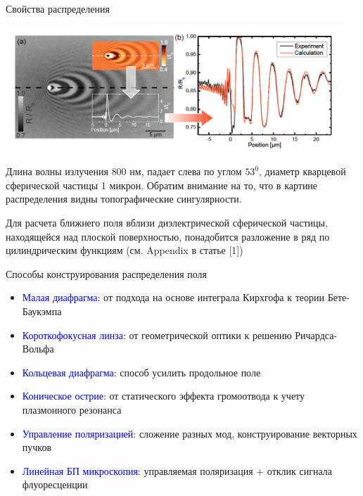 \documentclass[9pt, compress, xcolor=table]{beamer}
\begin{document}
\begin{frame}{Свойства распределения}

\begin{center}
\includegraphics[width=0.95\textwidth]{near-field1}
\end{center}

Длина волны излучения $800$ нм, падает слева по углом $53^{0}$, диаметр кварцевой сферической частицы 1 микрон. Обратим внимание на то, что в картине распределения видны топографические сингулярности.

Для расчета ближнего поля вблизи диэлектрической сферической частицы, находящейся над плоской поверхностью, понадобится разложение в ряд по цилиндрическим функциям (см. Appendix в статье [1])
\end{frame}

\begin{frame}{Способы конструирования распределения поля}

\begin{itemize}
\item \textcolor{blue}{Малая диафрагма}: от подхода на основе интеграла Кирхгофа к теории Бете-Баукэмпа

\item \textcolor{blue}{Короткофокусная линза}: от геометрической оптики к решению Ричардса-Вольфа

\item \textcolor{blue}{Кольцевая диафрагма}: способ усилить продольное поле

\item \textcolor{blue}{Коническое острие}: от статического эффекта громоотвода к учету плазмонного резонанса

\item \textcolor{blue}{Управление поляризацией}: сложение разных мод, конструирование векторных пучков

\item \textcolor{blue}{Линейная БП микроскопия}: управляемая поляризация + отклик сигнала флуоресценции

\end{itemize}


\end{frame}
\end{document}
